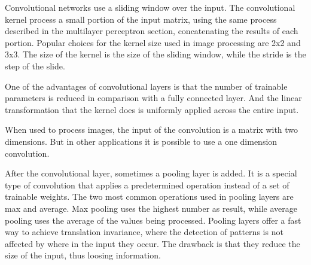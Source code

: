 Convolutional networks \cite{lecun_backpropagation_1989}\cite{lecun_convolutional_1995} use a sliding window over the input. The convolutional kernel process a small portion of the input matrix, using the same process described in the multilayer perceptron section, concatenating the results of each portion. Popular choices for the kernel size used in image processing are 2x2 and 3x3. The size of the kernel is the size of the sliding window, while the stride is the step of the slide.

One of the advantages of convolutional layers is that the number of trainable parameters is reduced in comparison with a fully connected layer. And the linear transformation that the kernel does is uniformly applied across the entire input.

When used to process images, the input of the convolution is a matrix with two dimensions. But in other applications it is possible to use a one dimension convolution.

After the convolutional layer, sometimes a pooling layer is added. It is a special type of convolution that applies a predetermined operation instead of a set of trainable weights. The two most common operations used in pooling layers are max and average. Max pooling uses the highest number as result, while average pooling uses the average of the values being processed. Pooling layers offer a fast way to achieve translation invariance, where the detection of patterns is not affected by where in the input they occur. The drawback is that they reduce the size of the input, thus loosing information.